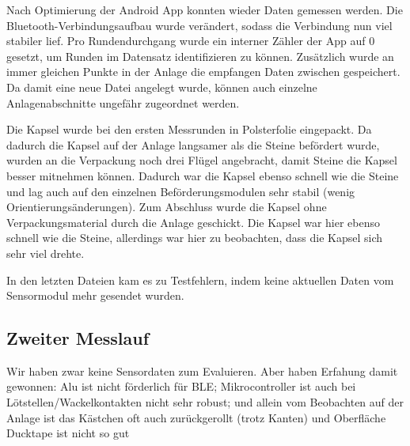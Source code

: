 Nach Optimierung der Android App konnten wieder Daten gemessen werden. Die Bluetooth-Verbindungsaufbau wurde verändert, sodass die Verbindung nun viel stabiler lief. Pro Rundendurchgang wurde ein interner Zähler der App auf 0 gesetzt, um Runden im Datensatz identifizieren zu können. Zusätzlich wurde an immer gleichen Punkte in der Anlage die empfangen Daten zwischen gespeichert. Da damit eine neue Datei angelegt wurde, können auch einzelne Anlagenabschnitte ungefähr zugeordnet werden.

Die Kapsel wurde bei den ersten Messrunden in Polsterfolie eingepackt. Da dadurch die Kapsel auf der Anlage langsamer als die Steine befördert wurde, wurden an die Verpackung noch drei Flügel angebracht, damit Steine die Kapsel besser mitnehmen können. Dadurch war die Kapsel ebenso schnell wie die Steine und lag auch auf den einzelnen Beförderungsmodulen sehr stabil (wenig Orientierungsänderungen). Zum Abschluss wurde die Kapsel ohne Verpackungsmaterial durch die Anlage geschickt. Die Kapsel war hier ebenso schnell wie die Steine, allerdings war hier zu beobachten, dass die Kapsel sich sehr viel drehte. 

In den letzten Dateien kam es zu Testfehlern, indem keine aktuellen Daten vom Sensormodul mehr gesendet wurden.


\subsection{Zweiter Messlauf}
Wir haben zwar keine Sensordaten zum Evaluieren. Aber haben Erfahung damit gewonnen: Alu ist nicht förderlich für BLE; Mikrocontroller ist auch bei Lötstellen/Wackelkontakten nicht sehr robust; und allein vom Beobachten auf der Anlage ist das Kästchen oft auch zurückgerollt (trotz Kanten) und Oberfläche Ducktape ist nicht so gut